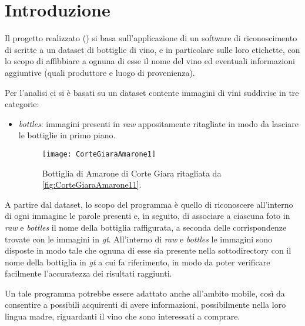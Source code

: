 \documentclass[11pt, a4paper, titlepage]{report}
\begin{document}
\begin{frontespizio}
\Margini{2.5cm}{3cm}{2.5cm}{3cm}
\Sottotitolo{}
\end{frontespizio}


\tableofcontents
\newpage

\chapter{Introduzione}
Il progetto realizzato (\cite{github-link}) si basa sull'applicazione di un software di riconoscimento di scritte a un dataset di bottiglie di vino, e in particolare sulle loro etichette, con lo scopo di affibbiare a ognuna di esse il nome del vino ed eventuali informazioni aggiuntive (quali produttore e luogo di provenienza). 

Per l'analisi ci si è basati su un dataset contente immagini di vini suddivise in tre categorie:
\begin{itemize}
	\item \emph{bottles}\label{bottles}: immagini presenti in \emph{raw} appositamente ritagliate in modo da lasciare le bottiglie in primo piano.
	\medskip
	\begin{figure}[H]
	\centering 
	\texttt{[image: CorteGiaraAmarone1]}
	\caption{Bottiglia di Amarone di Corte Giara ritagliata da \cref{fig:CorteGiaraAmarone11}.}
	\end{figure}
\end{itemize}

A partire dal dataset, lo scopo del programma è quello di riconoscere all'interno di ogni immagine le parole presenti e, in seguito, di associare a ciascuna foto in \emph{raw} e \emph{bottles} il nome della bottiglia raffigurata, a seconda delle corrispondenze trovate con le immagini in \emph{gt}. All'interno di \emph{raw} e \emph{bottles} le immagini sono disposte in modo tale che ognuna di esse sia presente nella sottodirectory con il nome della bottiglia in \emph{gt} a cui fa riferimento, in modo da poter verificare facilmente l'accuratezza dei risultati raggiunti. 

\medskip
Un tale programma potrebbe essere adattato anche all'ambito mobile, così da consentire a possibili acquirenti di avere informazioni, possibilmente nella loro lingua madre, riguardanti il vino che sono interessati a comprare. 

\pagebreak


 

\end{document}
